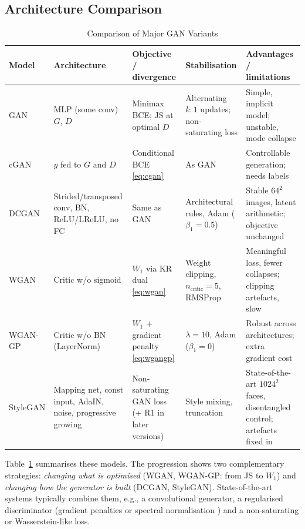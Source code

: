 \documentclass[conference]{IEEEtran}
\newcommand{\JS}{\mathrm{JS}}
\theoremstyle{plain}
\theoremstyle{definition}
\begin{document}
\subsection{Architecture Comparison}
\begin{table}[t]
\centering
\caption{Comparison of Major GAN Variants}
\label{tab:compare}
\footnotesize
\renewcommand{\arraystretch}{1.15}
\begin{tabular}{@{}p{1.6cm}p{3.3cm}p{3.3cm}p{3.6cm}p{3.6cm}@{}}
\toprule
\textbf{Model} & \textbf{Architecture} & \textbf{Objective / divergence} & \textbf{Stabilisation} & \textbf{Advantages / limitations} \\
\midrule
GAN \cite{goodfellow2014gan} & MLP (some conv) $G$, $D$ & Minimax BCE; $\JS$ at optimal $D$ & Alternating $k{:}1$ updates; non-saturating loss & Simple, implicit model; unstable, mode collapse \\
cGAN \cite{mirza2014cgan} & $y$ fed to $G$ and $D$ & Conditional BCE \eqref{eq:cgan} & As GAN & Controllable generation; needs labels \\
DCGAN \cite{radford2016dcgan} & Strided/transposed conv, BN, ReLU/LReLU, no FC & Same as GAN & Architectural rules, Adam ($\beta_1{=}0.5$) & Stable $64^2$ images, latent arithmetic; objective unchanged \\
WGAN \cite{arjovsky2017wgan} & Critic w/o sigmoid & $W_1$ via KR dual \eqref{eq:wgan} & Weight clipping, $n_{\text{critic}}{=}5$, RMSProp & Meaningful loss, fewer collapses; clipping artefacts, slow \\
WGAN-GP \cite{gulrajani2017wgangp} & Critic w/o BN (LayerNorm) & $W_1$ + gradient penalty \eqref{eq:wgangp} & $\lambda{=}10$, Adam ($\beta_1{=}0$) & Robust across architectures; extra gradient cost \\
StyleGAN \cite{karras2019stylegan} & Mapping net, const input, AdaIN, noise, progressive growing & Non-saturating GAN loss (+ R1 in later versions) & Style mixing, truncation & State-of-the-art $1024^2$ faces, disentangled control; artefacts fixed in \cite{karras2020stylegan2} \\
\bottomrule
\end{tabular}
\end{table}

Table~\ref{tab:compare} summarises these models. The progression shows two complementary strategies: \emph{changing what is optimised} (WGAN, WGAN-GP: from JS to $W_1$) and \emph{changing how the generator is built} (DCGAN, StyleGAN). State-of-the-art systems typically combine them, e.g., a convolutional generator, a regularised discriminator (gradient penalties or spectral normalisation \cite{miyato2018spectral}) and a non-saturating or Wasserstein-like loss.
\end{document}

